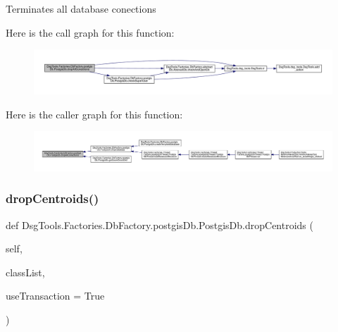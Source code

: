 \begin{DoxyVerb}Terminates all database conections
\end{DoxyVerb}
 Here is the call graph for this function\+:
\nopagebreak
\begin{figure}[H]
\begin{center}
\leavevmode
\includegraphics[width=350pt]{class_dsg_tools_1_1_factories_1_1_db_factory_1_1postgis_db_1_1_postgis_db_a6dd38e550a884054ab70550fcd714c32_cgraph}
\end{center}
\end{figure}
Here is the caller graph for this function\+:
\nopagebreak
\begin{figure}[H]
\begin{center}
\leavevmode
\includegraphics[width=350pt]{class_dsg_tools_1_1_factories_1_1_db_factory_1_1postgis_db_1_1_postgis_db_a6dd38e550a884054ab70550fcd714c32_icgraph}
\end{center}
\end{figure}
\mbox{\label{class_dsg_tools_1_1_factories_1_1_db_factory_1_1postgis_db_1_1_postgis_db_a38741d156f8168459c1e9579aac213d2}} 
\subsubsection{\texorpdfstring{drop\+Centroids()}{dropCentroids()}}
{\footnotesize\ttfamily def Dsg\+Tools.\+Factories.\+Db\+Factory.\+postgis\+Db.\+Postgis\+Db.\+drop\+Centroids (\begin{DoxyParamCaption}\item[{}]{self,  }\item[{}]{class\+List,  }\item[{}]{use\+Transaction = {\ttfamily True} }\end{DoxyParamCaption})}

